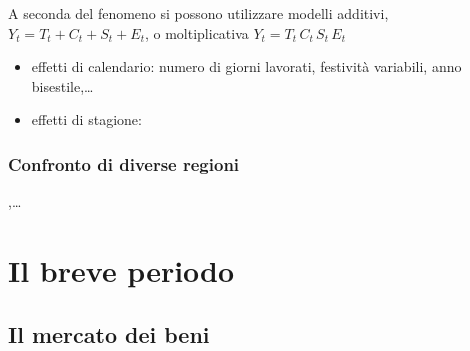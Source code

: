 \documentclass[letterpaper,10pt,italian]{jupyterBook}
\begin{document}
\sphinxAtStartPar
A seconda del fenomeno si possono utilizzare modelli additivi, \(Y_t = T_t + C_t + S_t + E_t\), o moltiplicativa \(Y_t = T_t \, C_t \, S_t \, E_t\)

\sphinxAtStartPar
{}
\begin{itemize}
\item {} 
\sphinxAtStartPar
effetti di calendario: numero di giorni lavorati, festività variabili, anno bisestile,…

\item {} 
\sphinxAtStartPar
effetti di stagione:

\end{itemize}


\subsubsection{Confronto di diverse regioni}
\label{\detokenize{ch/macro:confronto-di-diverse-regioni}}\label{\detokenize{ch/macro:economics-hs-macro-intro-comparisons-space}}
\sphinxAtStartPar
{},…


\section{Il breve periodo}
\label{\detokenize{ch/macro:il-breve-periodo}}\label{\detokenize{ch/macro:economics-hs-macro-short-run}}

\subsection{Il mercato dei beni}
\label{\detokenize{ch/macro:il-mercato-dei-beni}}\label{\detokenize{ch/macro:economics-hs-macro-short-run-goods-market}}
\end{document}

